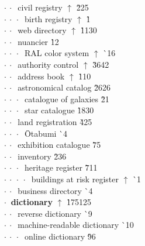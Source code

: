 \begin{tabbing}
$\cdot\:\cdot\:$  civil registry $\uparrow$ \` 2{\raisebox{.4\height}{\scalebox{.6}{+}}}25\\
$\cdot\:\cdot\:\cdot\:$  birth registry $\uparrow$ \` 1\\
$\cdot\:\cdot\:$  web directory $\uparrow$ \` 11{\raisebox{.4\height}{\scalebox{.6}{+}}}30\\
$\cdot\:\cdot\:$  nuancier  \` 1{\raisebox{.4\height}{\scalebox{.6}{+}}}2\\
$\cdot\:\cdot\:\cdot\:$  RAL color system $\uparrow$ \` {\raisebox{.4\height}{\scalebox{.6}{+}}}16\\
$\cdot\:\cdot\:$  authority control $\uparrow$ \` 36{\raisebox{.4\height}{\scalebox{.6}{+}}}42\\
$\cdot\:\cdot\:$  address book $\uparrow$ \` 1{\raisebox{.4\height}{\scalebox{.6}{+}}}10\\
$\cdot\:\cdot\:$  astronomical catalog  \` 26{\raisebox{.4\height}{\scalebox{.6}{+}}}26\\
$\cdot\:\cdot\:\cdot\:$  catalogue of galaxies  \` 2{\raisebox{.4\height}{\scalebox{.6}{+}}}1\\
$\cdot\:\cdot\:\cdot\:$  star catalogue  \` 18{\raisebox{.4\height}{\scalebox{.6}{+}}}30\\
$\cdot\:\cdot\:$  land registration  \` 4{\raisebox{.4\height}{\scalebox{.6}{+}}}25\\
$\cdot\:\cdot\:\cdot\:$  Ōtabumi  \` {\raisebox{.4\height}{\scalebox{.6}{+}}}4\\
$\cdot\:\cdot\:$  exhibition catalogue  \` 7{\raisebox{.4\height}{\scalebox{.6}{+}}}5\\
$\cdot\:\cdot\:$  inventory  \` 2{\raisebox{.4\height}{\scalebox{.6}{+}}}36\\
$\cdot\:\cdot\:\cdot\:$  heritage register  \` 71{\raisebox{.4\height}{\scalebox{.6}{+}}}1\\
$\cdot\:\cdot\:\cdot\:\cdot\:$  buildings at risk register $\uparrow$ \` {\raisebox{.4\height}{\scalebox{.6}{+}}}1\\
$\cdot\:\cdot\:$  business directory  \` {\raisebox{.4\height}{\scalebox{.6}{+}}}4\\
$\cdot\:$  \textbf{dictionary} $\uparrow$ \` 175{\raisebox{.4\height}{\scalebox{.6}{+}}}125\\
$\cdot\:\cdot\:$  reverse dictionary  \` {\raisebox{.4\height}{\scalebox{.6}{+}}}9\\
$\cdot\:\cdot\:$  machine-readable dictionary  \` {\raisebox{.4\height}{\scalebox{.6}{+}}}10\\
$\cdot\:\cdot\:\cdot\:$  online dictionary  \` 9{\raisebox{.4\height}{\scalebox{.6}{+}}}6\\

\end{tabbing}
